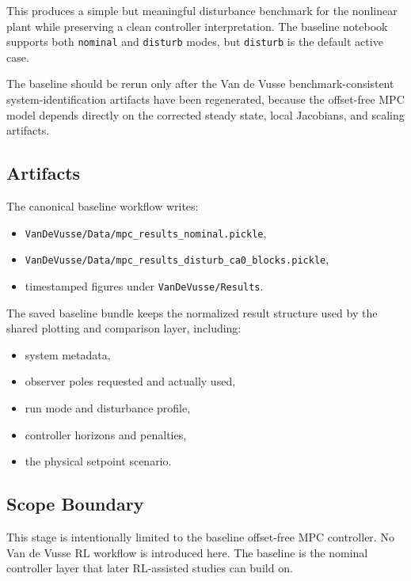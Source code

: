 This produces a simple but meaningful disturbance benchmark for the nonlinear plant while preserving a clean controller interpretation. The baseline notebook supports both \texttt{nominal} and \texttt{disturb} modes, but \texttt{disturb} is the default active case.

The baseline should be rerun only after the Van de Vusse benchmark-consistent system-identification artifacts have been regenerated, because the offset-free MPC model depends directly on the corrected steady state, local Jacobians, and scaling artifacts.

\subsection{Artifacts}

The canonical baseline workflow writes:
\begin{itemize}
    \item \texttt{VanDeVusse/Data/mpc\_results\_nominal.pickle},
    \item \texttt{VanDeVusse/Data/mpc\_results\_disturb\_ca0\_blocks.pickle},
    \item timestamped figures under \texttt{VanDeVusse/Results}.
\end{itemize}

The saved baseline bundle keeps the normalized result structure used by the shared plotting and comparison layer, including:
\begin{itemize}
    \item system metadata,
    \item observer poles requested and actually used,
    \item run mode and disturbance profile,
    \item controller horizons and penalties,
    \item the physical setpoint scenario.
\end{itemize}

\subsection{Scope Boundary}

This stage is intentionally limited to the baseline offset-free MPC controller. No Van de Vusse RL workflow is introduced here. The baseline is the nominal controller layer that later RL-assisted studies can build on.

